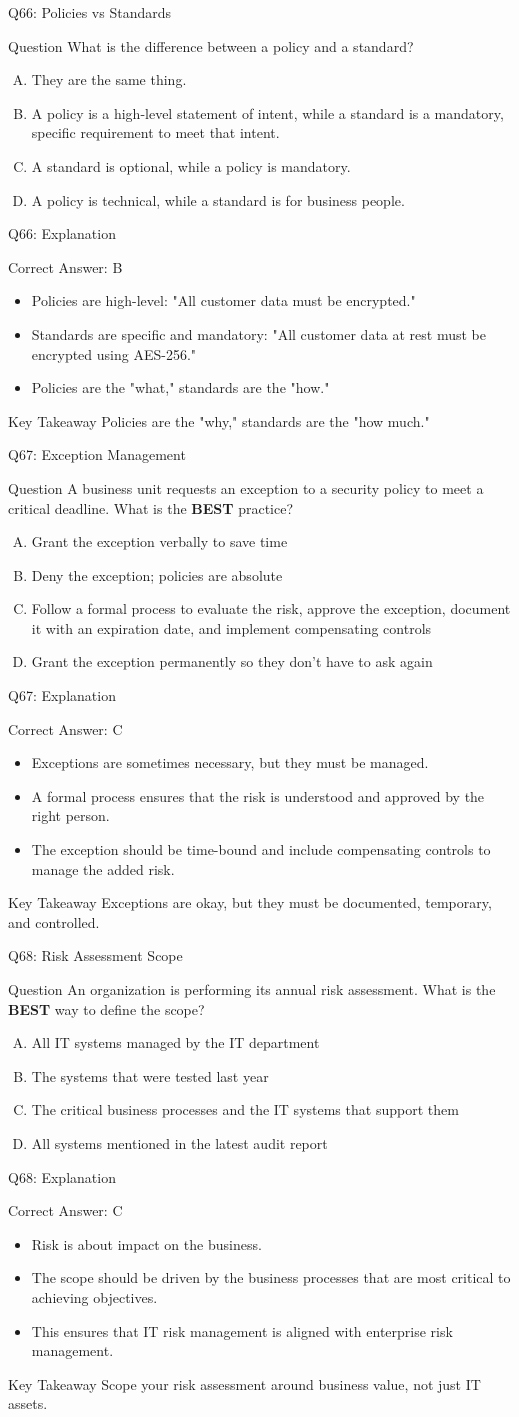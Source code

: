 \documentclass[aspectratio=169]{beamer}
\newcommand{\hq}[7]{%
	\begin{frame}{Q#1: #2}
		\begin{block}{Question}
			#3
		\end{block}
		\begin{enumerate}[(A)]
			#4
		\end{enumerate}
	\end{frame}
	\begin{frame}{Q#1: Explanation}
		\begin{block}{Correct Answer: #5}
			\begin{itemize}
				#6
			\end{itemize}
		\end{block}
		\begin{alertblock}{Key Takeaway}
			#7
		\end{alertblock}
	\end{frame}
}
\begin{document}
	\hq{66}{Policies vs Standards}
	{What is the difference between a policy and a standard?}
	{\item They are the same thing.
		\item A policy is a high-level statement of intent, while a standard is a mandatory, specific requirement to meet that intent.
		\item A standard is optional, while a policy is mandatory.
		\item A policy is technical, while a standard is for business people.}
	{B}
	{\item Policies are high-level: "All customer data must be encrypted."
		\item Standards are specific and mandatory: "All customer data at rest must be encrypted using AES-256."
		\item Policies are the "what," standards are the "how."}
	{Policies are the "why," standards are the "how much."}
	
	\hq{67}{Exception Management}
	{A business unit requests an exception to a security policy to meet a critical deadline. What is the \textbf{BEST} practice?}
	{\item Grant the exception verbally to save time
		\item Deny the exception; policies are absolute
		\item Follow a formal process to evaluate the risk, approve the exception, document it with an expiration date, and implement compensating controls
		\item Grant the exception permanently so they don't have to ask again}
	{C}
	{\item Exceptions are sometimes necessary, but they must be managed.
		\item A formal process ensures that the risk is understood and approved by the right person.
		\item The exception should be time-bound and include compensating controls to manage the added risk.}
	{Exceptions are okay, but they must be documented, temporary, and controlled.}
	
	\hq{68}{Risk Assessment Scope}
	{An organization is performing its annual risk assessment. What is the \textbf{BEST} way to define the scope?}
	{\item All IT systems managed by the IT department
		\item The systems that were tested last year
		\item The critical business processes and the IT systems that support them
		\item All systems mentioned in the latest audit report}
	{C}
	{\item Risk is about impact on the business.
		\item The scope should be driven by the business processes that are most critical to achieving objectives.
		\item This ensures that IT risk management is aligned with enterprise risk management.}
	{Scope your risk assessment around business value, not just IT assets.}
	
\end{document}
